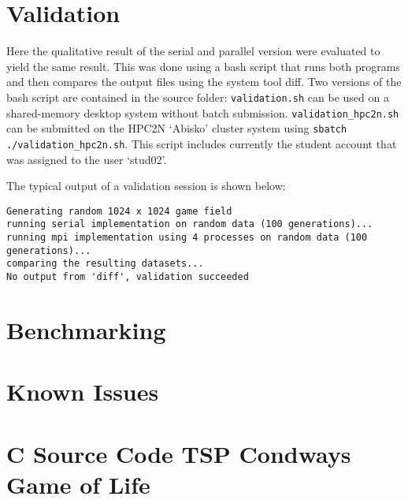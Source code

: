 \documentclass[a4paper,11pt,twoside]{article}
\begin{document}
\section{Validation}
Here the qualitative result of the serial and parallel version were evaluated to yield the same result. This was done using a bash script that runs both programs and then compares the output files using the system tool diff. Two versions of the bash script are contained in the source folder: \verb+validation.sh+ can be used on a shared-memory desktop system without batch submission. \verb+validation_hpc2n.sh+ can be submitted on the HPC2N `Abisko' cluster system using \verb+sbatch ./validation_hpc2n.sh+. This script includes currently the student account that was assigned to the user `stud02'.

The typical output of a validation session is shown below:
\begin{verbatim}
Generating random 1024 x 1024 game field
running serial implementation on random data (100 generations)...
running mpi implementation using 4 processes on random data (100 generations)...
comparing the resulting datasets...
No output from 'diff', validation succeeded
\end{verbatim}

\section{Benchmarking}

\section{Known Issues}



\appendix
\section{C Source Code TSP Condways Game of Life}{\label{app:gol}}
\end{document}
